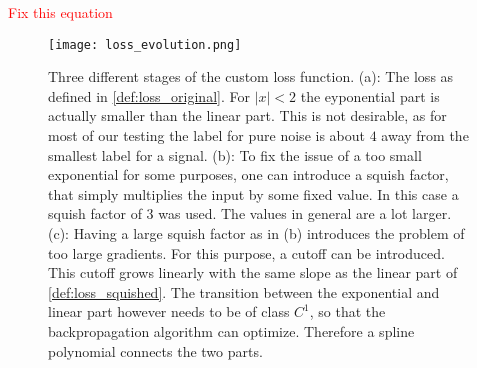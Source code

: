 \textcolor{red}{Fix this equation}
\begin{figure}
\centering
\texttt{[image: loss\_evolution.png]}
\caption[Loss iterations]{Three different stages of the custom loss function. (a): The loss as defined in \eqref{def:loss_original}. For $\left|x\right|<2$ the eyponential part is actually smaller than the linear part. This is not desirable, as for most of our testing the label for pure noise is about $4$ away from the smallest label for a signal. (b): To fix the issue of a too small exponential for some purposes, one can introduce a squish factor, that simply multiplies the input by some fixed value. In this case a squish factor of 3 was used. The values in general are a lot larger. (c): Having a large squish factor as in (b) introduces the problem of too large gradients. For this purpose, a cutoff can be introduced. This cutoff grows linearly with the same slope as the linear part of \eqref{def:loss_squished}. The transition between the exponential and linear part however needs to be of class $C^1$, so that the backpropagation algorithm can optimize. Therefore a spline polynomial connects the two parts.}\label{fig:loss_evolution}
\end{figure}
